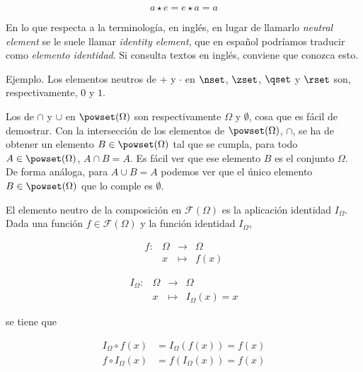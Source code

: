 $$ a \star e = e \star a = a $$

En lo que respecta a la terminología, en inglés, en lugar de llamarlo
\emph{neutral element} se le suele llamar \emph{identity element}, que en
español podríamos traducir como \emph{elemento identidad}. Si consulta
textos en inglés, conviene que conozca esto.

Ejemplo. Los elementos neutros de $+$ y $\cdot$ en $\nset$, $\zset$, $\qset$
y $\rset$ son, respectivamente, $0$ y $1$.

Los de $\cap$ y $\cup$ en $\powset(\Omega)$ son respectivamente $\Omega$ y
$\emptyset$, cosa que es fácil de demostrar. Con la intersección de los
elementos de $\powset(\Omega)$, $\cap$, se ha de obtener un elemento $B \in
\powset(\Omega)$ tal que se cumpla, para todo $A \in \powset(\Omega)$, $A
\cap B = A$. Es fácil ver que ese elemento $B$ es el conjunto $\Omega$. De
forma análoga, para $A \cup B = A$ podemos ver que el único elemento $B \in
\powset(\Omega)$ que lo comple es $\emptyset$.

El elemento neutro de la composición en $\mathcal{F}(\Omega)$ es la
aplicación identidad $I_\Omega$. Dada una función $f \in
\mathcal{F}(\Omega)$ y la función identidad $I_\Omega$,

\begin{center}
\begin{minipage}[t]{.45\textwidth}
  \centering
  $$
    \begin{array}{llll}
      f:  & \Omega  & \longrightarrow & \Omega \\
          & x       & \longmapsto     & f(x)
    \end{array}
  $$
\end{minipage}
\begin{minipage}[t]{.45\textwidth}
  \centering
  $$
    \begin{array}{llll}
      I_\Omega: & \Omega  & \longrightarrow & \Omega \\
                & x       & \longmapsto     & I_\Omega (x) = x
    \end{array}
  $$
\end{minipage}
\end{center}

\noindent se tiene que

\begin{align*}
  I_\Omega \circ f (x) &= I_\Omega (f(x)) = f(x) \\
  f \circ I_\Omega (x) &= f(I_\Omega (x)) = f(x) \\
\end{align*}


